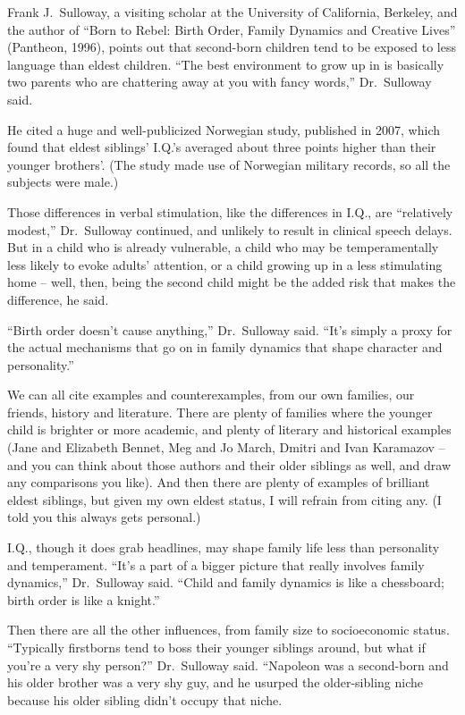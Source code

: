 ﻿\documentclass[12pt]{article}
\begin{document}
Frank J.~Sulloway, a visiting scholar at the University of California, Berkeley, and the author of
``Born to Rebel: Birth Order, Family Dynamics and Creative Lives'' (Pantheon, 1996), points out that
second-born children tend to be exposed to less language than eldest children. ``The best
environment to grow up in is basically two parents who are chattering away at you with fancy
words,'' Dr.~Sulloway said.

He cited a huge and well-publicized Norwegian study, published in 2007, which found that eldest
siblings' I.Q.'s averaged about three points higher than their younger brothers'. (The study made
use of Norwegian military records, so all the subjects were male.)

Those differences in verbal stimulation, like the differences in I.Q., are ``relatively modest,''
Dr.~Sulloway continued, and unlikely to result in clinical speech delays. But in a child who is
already vulnerable, a child who may be temperamentally less likely to evoke adults' attention, or a
child growing up in a less stimulating home -- well, then, being the second child might be the added
risk that makes the difference, he said.

``Birth order doesn't cause anything,'' Dr.~Sulloway said. ``It's simply a proxy for the actual
mechanisms that go on in family dynamics that shape character and personality.''

We can all cite examples and counterexamples, from our own families, our friends, history and
literature. There are plenty of families where the younger child is brighter or more academic, and
plenty of literary and historical examples (Jane and Elizabeth Bennet, Meg and Jo March, Dmitri and
Ivan Karamazov -- and you can think about those authors and their older siblings as well, and draw
any comparisons you like). And then there are plenty of examples of brilliant eldest siblings, but
given my own eldest status, I will refrain from citing any. (I told you this always gets personal.)

I.Q., though it does grab headlines, may shape family life less than personality and temperament.
``It's a part of a bigger picture that really involves family dynamics,'' Dr.~Sulloway said. ``Child
and family dynamics is like a chessboard; birth order is like a knight.''

Then there are all the other influences, from family size to socioeconomic status. ``Typically
firstborns tend to boss their younger siblings around, but what if you're a very shy person?''
Dr.~Sulloway said. ``Napoleon was a second-born and his older brother was a very shy guy, and he
usurped the older-sibling niche because his older sibling didn't occupy that niche.
\end{document}
